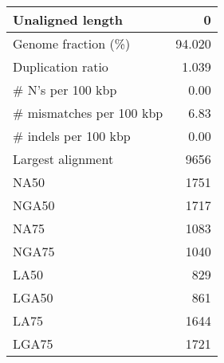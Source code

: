 \documentclass[12pt,a4paper]{article}
\begin{document}
\begin{table}[ht]
\begin{center}
\begin{tabular}{|l*{1}{|r}|}
Unaligned length & 0 \\ \hline
Genome fraction (\%) & 94.020 \\ \hline
Duplication ratio & 1.039 \\ \hline
\# N's per 100 kbp & 0.00 \\ \hline
\# mismatches per 100 kbp & 6.83 \\ \hline
\# indels per 100 kbp & 0.00 \\ \hline
Largest alignment & 9656 \\ \hline
NA50 & 1751 \\ \hline
NGA50 & 1717 \\ \hline
NA75 & 1083 \\ \hline
NGA75 & 1040 \\ \hline
LA50 & 829 \\ \hline
LGA50 & 861 \\ \hline
LA75 & 1644 \\ \hline
LGA75 & 1721 \\ \hline
\end{tabular}
\end{center}
\end{table}
\end{document}
